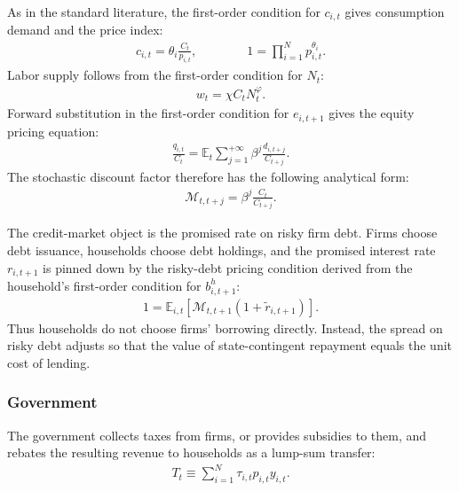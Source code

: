 \documentclass[12pt]{article}
\numberwithin{equation}{section}
\begin{document}
As in the standard literature, the first-order condition for $c_{i,t}$ gives consumption demand and the price index:
\begin{align*}
    c_{i,t}
    =
    \theta_i\frac{C_t}{p_{i,t}},
    \qquad \qquad
    1
    =
    \prod_{i=1}^N p_{i,t}^{\theta_i}.
\end{align*}
Labor supply follows from the first-order condition for $N_t$:
\begin{align*}
    w_t = \chi C_t N_t^{\varphi}.
\end{align*}
Forward substitution in the first-order condition for $e_{i,t+1}$ gives the equity pricing equation:
\begin{align*}
    \frac{q_{i,t}}{C_t} = \mathbb{E}_t \sum_{j=1}^{+\infty} \beta^j \frac{d_{i,t+j}}{C_{t+j}}.
\end{align*}
The stochastic discount factor therefore has the following analytical form:
\begin{align*}
    \mathcal{M}_{t, t+j} = \beta^j \frac{C_t}{C_{t+j}}.
\end{align*}

The credit-market object is the promised rate on risky firm debt. Firms choose debt issuance, households choose debt holdings, and the promised interest rate $r_{i,t+1}$ is pinned down by the risky-debt pricing condition derived from the household's first-order condition for $b^h_{i,t+1}$:
\begin{align}\label{eq:risky_debt_pricing}
    1
    =
    \mathbb{E}_{i,t}
    \left[
        \mathcal M_{t,t+1}
        (1+\tilde r_{i,t+1})
    \right].
\end{align}
Thus households do not choose firms' borrowing directly. Instead, the spread on risky debt adjusts so that the value of state-contingent repayment equals the unit cost of lending.

\subsubsection{Government}
The government collects taxes from firms, or provides subsidies to them, and rebates the resulting revenue to households as a lump-sum transfer:
\begin{align*}
    T_t
    \equiv
    \sum_{i=1}^{N}
        \tau_{i,t}p_{i,t}y_{i,t}.
\end{align*}








\clearpage


\end{document}
